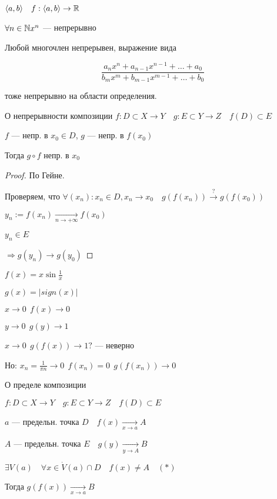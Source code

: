 

\cfoot{}


    \begin{example}
        $\langle a,b \rangle \quad f:\langle a, b\rangle \to \mathbb{R}$

        $\forall n\in\mathbb{N} x^n$ --- непрерывно

        Любой многочлен непрерывен, выражение вида

        $$\frac{a_nx^n+a_{n-1}x^{n-1}+\ldots+a_0}{b_mx^m+b_{m-1}x^{m-1}+\ldots+b_0}$$

        тоже непрерывно на области определения.
    \end{example}
    \begin{theorem}
        О непрерывности композиции
        $f:D\subset X\to Y \quad g:E\subset Y\to Z \quad f(D)\subset E$

        $f$ --- непр. в $x_0\in D$, $g$ --- непр. в $f(x_0)$

        Тогда $g\circ f$ непр. в $x_0$
    \end{theorem}
    \begin{proof}
        По Гейне.

        Проверяем, что $\forall (x_n): x_n\in D, x_n\to x_0 \quad g(f(x_n))\xrightarrow{?} g(f(x_0))$

        $y_n:=f(x_n)\xrightarrow[n\to+\infty]{} f(x_0)$

        $y_n\in E$

        $\Rightarrow g(y_n)\to g(y_0)$
    \end{proof}
    \begin{remark}
        $f(x)=x\sin\frac{1}{x}$
        
        $g(x)=|sign(x)|$

        $x\to 0 \ \ f(x)\to 0$

        $y\to 0 \ \ g(y)\to 1$

        $x\to 0 \ \ g(f(x))\to 1?$ --- неверно

        Но: $x_n=\frac{1}{\pi n}\to 0 \ \ f(x_n)=0 \ \ g(f(x_n))\to 0$
    \end{remark}
    \begin{theorem}
        О пределе композиции

        $f:D\subset X\to Y \quad g:E\subset Y\to Z \quad f(D)\subset E$

        $a$ --- предельн. точка $D \quad f(x)\xrightarrow[x\to a]{} A$

        $A$ --- предельн. точка $E \quad g(y)\xrightarrow[y\to A]{} B$

        $\exists V(a) \quad \forall x\in \dot V(a)\cap D \quad f(x)\not=A \quad (*)$

        Тогда $g(f(x))\xrightarrow[x\to a]{} B$
    \end{theorem}
